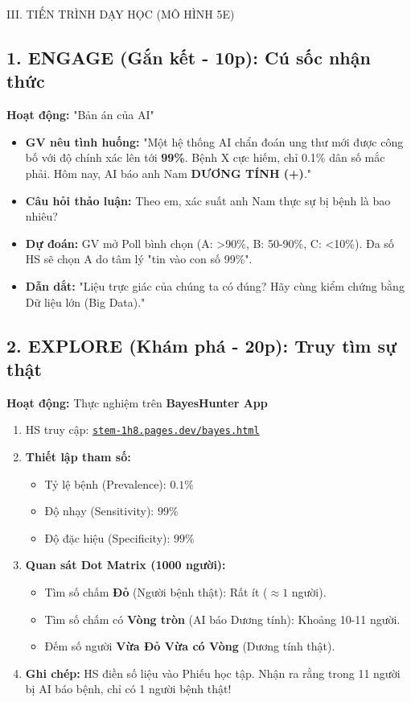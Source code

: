 \documentclass[12pt,a4paper]{article}
\begin{document}
\begin{sectionbox}{III. TIẾN TRÌNH DẠY HỌC (MÔ HÌNH 5E)}

\subsection*{1. ENGAGE (Gắn kết - 10p): Cú sốc nhận thức}
\textbf{Hoạt động:} "Bản án của AI"
\begin{itemize}
    \item \textbf{GV nêu tình huống:} "Một hệ thống AI chẩn đoán ung thư mới được công bố với độ chính xác lên tới \textbf{99\%}. Bệnh X cực hiếm, chỉ 0.1\% dân số mắc phải. Hôm nay, AI báo anh Nam \textbf{DƯƠNG TÍNH (+)}."
    \item \textbf{Câu hỏi thảo luận:} Theo em, xác suất anh Nam thực sự bị bệnh là bao nhiêu?
    \item \textbf{Dự đoán:} GV mở Poll bình chọn (A: >90\%, B: 50-90\%, C: <10\%). Đa số HS sẽ chọn A do tâm lý "tin vào con số 99\%".
    \item \textbf{Dẫn dắt:} "Liệu trực giác của chúng ta có đúng? Hãy cùng kiểm chứng bằng Dữ liệu lớn (Big Data)."
\end{itemize}

\subsection*{2. EXPLORE (Khám phá - 20p): Truy tìm sự thật}
\textbf{Hoạt động:} Thực nghiệm trên \textbf{BayesHunter App}
\begin{enumerate}
    \item HS truy cập: \href{https://stem-1h8.pages.dev/bayes.html}{\texttt{stem-1h8.pages.dev/bayes.html}}
    \item \textbf{Thiết lập tham số:}
    \begin{itemize}
        \item Tỷ lệ bệnh (Prevalence): $0.1\%$
        \item Độ nhạy (Sensitivity): $99\%$
        \item Độ đặc hiệu (Specificity): $99\%$
    \end{itemize}
    \item \textbf{Quan sát Dot Matrix (1000 người):}
    \begin{itemize}
        \item Tìm số chấm \textbf{Đỏ} (Người bệnh thật): Rất ít ($\approx 1$ người).
        \item Tìm số chấm có \textbf{Vòng tròn} (AI báo Dương tính): Khoảng 10-11 người.
        \item Đếm số người \textbf{Vừa Đỏ Vừa có Vòng} (Dương tính thật).
    \end{itemize}
    \item \textbf{Ghi chép:} HS điền số liệu vào Phiếu học tập. Nhận ra rằng trong 11 người bị AI báo bệnh, chỉ có 1 người bệnh thật!
\end{enumerate}


\end{sectionbox}
\end{document}
